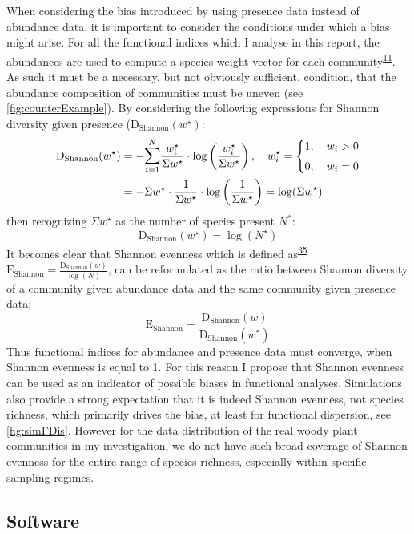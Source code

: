 \documentclass[
  10pt,
]{article}
\begin{document}
When considering the bias introduced by using presence data instead of abundance data, it is important to consider the conditions under which a bias might arise. For all the functional indices which I analyse in this report, the abundances are used to compute a species-weight vector for each community\textsuperscript{\protect\hyperlink{ref-Villeger2008}{11}}. As such it must be a necessary, but not obviously sufficient, condition, that the abundance composition of communities must be uneven (see \autoref{fig:counterExample}). By considering the following expressions for Shannon diversity given presence (\(\mathrm{D_{Shannon}}(w^\star)\):
\begin{align*}
\mathrm{D_{Shannon}}(w^\star) &= -\mathlarger\sum_{i = 1}^N \frac{w^\star_i}{\Sigma w^\star} \cdot \log\left(\frac{w^\star_i}{\Sigma w^\star}\right), \quad w^\star_i = 
  \begin{dcases}
    1,\quad  w_i > 0 \\ 
    0, \quad w_i = 0 
  \end{dcases} \\
&= -\Sigma w^\star \cdot \frac{1}{\Sigma w^\star} \cdot \log\left(\frac{1}{\Sigma w^\star}\right) = \log(\Sigma w^\star)
\end{align*}
then recognizing \(\Sigma w^\star\) as the number of species present \(N^*\):
\[\mathrm{D_{Shannon}}(w^\star)=\log(N^\star)\]
It becomes clear that Shannon evenness which is defined as\textsuperscript{\protect\hyperlink{ref-Magurran2010}{35}} \(\mathrm{E_{Shannon}} = \frac{\mathrm{D_{Shannon}}(w)}{\log(N)}\), can be reformulated as the ratio between Shannon diversity of a community given abundance data and the same community given presence data:
\[\mathrm{E_{Shannon}}=\frac{\mathrm{D_{Shannon}}(w)}{\mathrm{D_{Shannon}}(w^*)}\]
Thus functional indices for abundance and presence data must converge, when Shannon evenness is equal to 1. For this reason I propose that Shannon evenness can be used as an indicator of possible biases in functional analyses. Simulations also provide a strong expectation that it is indeed Shannon evenness, not species richness, which primarily drives the bias, at least for functional dispersion, see \autoref{fig:simFDis}. However for the data distribution of the real woody plant communities in my investigation, we do not have such broad coverage of Shannon evenness for the entire range of species richness, especially within specific sampling regimes.

\hypertarget{software}{%
\subsection{Software}\label{software}}
\end{document}
